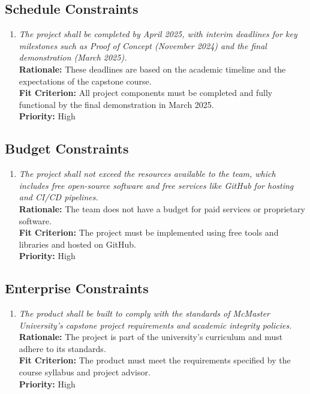 \documentclass[12pt]{article}
\begin{document}
\subsection{Schedule Constraints}
\begin{enumerate}[label=SCHD \arabic*., wide=0pt, leftmargin=*]
    \item \emph{The project shall be completed by April 2025, with interim deadlines for key milestones such as Proof of Concept (November 2024) and the final demonstration (March 2025).}\\[2mm]
    {\bf Rationale:} These deadlines are based on the academic timeline and the expectations of the capstone course.\\
    {\bf Fit Criterion:} All project components must be completed and fully functional by the final demonstration in March 2025.\\
    {\bf Priority:} High
\end{enumerate}
\subsection{Budget Constraints}
\begin{enumerate}[label=BDGT \arabic*., wide=0pt, leftmargin=*]
    \item \emph{The project shall not exceed the resources available to the team, which includes free open-source software and free services like GitHub for hosting and CI/CD pipelines.}\\[2mm]
    {\bf Rationale:} The team does not have a budget for paid services or proprietary software.\\
    {\bf Fit Criterion:} The project must be implemented using free tools and libraries and hosted on GitHub.\\
    {\bf Priority:} High
\end{enumerate}
\subsection{Enterprise Constraints}
\begin{enumerate}[label=ENTP \arabic*., wide=0pt, leftmargin=*]
    \item \emph{The product shall be built to comply with the standards of McMaster University’s capstone project requirements and academic integrity policies.}\\[2mm]
    {\bf Rationale:} The project is part of the university’s curriculum and must adhere to its standards.\\
    {\bf Fit Criterion:} The product must meet the requirements specified by the course syllabus and project advisor.\\
    {\bf Priority:} High
\end{enumerate}
\end{document}
